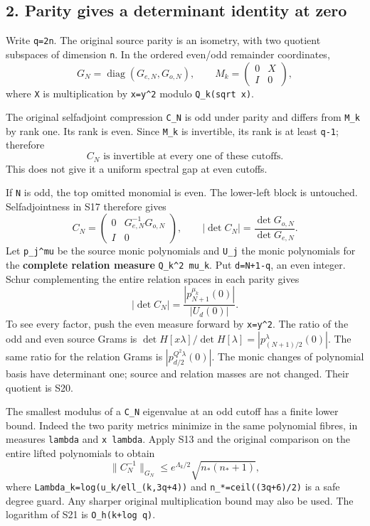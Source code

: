 \subsection{2. Parity gives a determinant identity at zero}\label{parity-gives-a-determinant-identity-at-zero}

Write \texttt{q=2n}. The original source parity is an isometry, with two quotient subspaces of dimension \texttt{n}. In the ordered even/odd remainder coordinates, \[
 G_N=\operatorname{diag}(G_{e,N},G_{o,N}),\qquad
 M_k=\begin{pmatrix}0&X\\I&0\end{pmatrix},                         \tag{S17}
\] where \texttt{X} is multiplication by \texttt{x=y\^{}2} modulo \texttt{Q\_k(sqrt\ x)}.

The original selfadjoint compression \texttt{C\_N} is odd under parity and differs from \texttt{M\_k} by rank one. Its rank is even. Since \texttt{M\_k} is invertible, its rank is at least \texttt{q-1}; therefore \[
 \boxed{C_N\text{ is invertible at every one of these cutoffs.}}   \tag{S18}
\] This does not give it a uniform spectral gap at even cutoffs.

If \texttt{N} is odd, the top omitted monomial is even. The lower-left block is untouched. Selfadjointness in S17 therefore gives \[
 C_N=\begin{pmatrix}0&G_{e,N}^{-1}G_{o,N}\\I&0\end{pmatrix},
 \qquad |\det C_N|=\frac{\det G_{o,N}}{\det G_{e,N}}.               \tag{S19}
\] Let \texttt{p\_j\^{}mu} be the source monic polynomials and \texttt{U\_j} the monic polynomials for the \textbf{complete relation measure} \texttt{Q\_k\^{}2\ mu\_k}. Put \texttt{d=N+1-q}, an even integer. Schur complementing the entire relation spaces in each parity gives \[
 \boxed{|\det C_N|=\frac{|p_{N+1}^{\mu_k}(0)|}{|U_d(0)|}.}         \tag{S20}
\] To see every factor, push the even measure forward by \texttt{x=y\^{}2}. The ratio of the odd and even source Grams is \(\det H[x\lambda]/\det H[\lambda]=|p_{(N+1)/2}^{\lambda}(0)|\). The same ratio for the relation Grams is \(|p_{d/2}^{Q^2\lambda}(0)|\). The monic changes of polynomial basis have determinant one; source and relation masses are not changed. Their quotient is S20.

The smallest modulus of a \texttt{C\_N} eigenvalue at an odd cutoff has a finite lower bound. Indeed the two parity metrics minimize in the same polynomial fibres, in measures \texttt{lambda} and \texttt{x\ lambda}. Apply S13 and the original comparison on the entire lifted polynomials to obtain \[
 \|C_N^{-1}\|_{G_N}
 \le e^{\Lambda_k/2}\sqrt{n_* (n_*+1)},                            \tag{S21}
\] where \nolinkurl{Lambda_k=log(u_k/ell_(k,3q+4))} and \nolinkurl{n_*=ceil((3q+6)/2)} is a safe degree guard. Any sharper original multiplication bound may also be used. The logarithm of S21 is \texttt{O\_h(k+log\ q)}.


